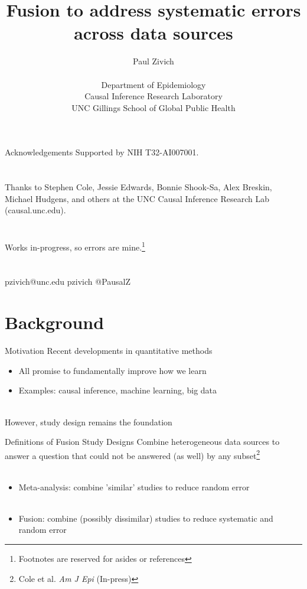 \documentclass{beamer}
\title[Data Fusion]{Fusion to address systematic errors across data sources}
\author[Paul Zivich]{Paul Zivich \\~\\ Department of Epidemiology \\ Causal Inference Research Laboratory \\ UNC Gillings School of Global Public Health}
\begin{document}
\begin{frame}[plain]
    \maketitle
\end{frame}

\begin{frame}{Acknowledgements}
	Supported by NIH T32-AI007001.\\~\\~\\
	
	Thanks to Stephen Cole, Jessie Edwards, Bonnie Shook-Sa, Alex Breskin, Michael Hudgens, and others at the UNC Causal Inference Research Lab (causal.unc.edu).\\~\\~\\
	
	Works in-progress, so errors are mine.\footnote[frame]{Footnotes are reserved for asides or references}\\~\\~\\
	
	\faEnvelope \quad pzivich@unc.edu \qquad \quad 
	\faGithub \quad pzivich \qquad \quad 
	\faTwitter \quad @PausalZ\\
\end{frame}

\section{Background}

\begin{frame}{Motivation}
	Recent developments in quantitative methods
	\begin{itemize}
		\item All promise to fundamentally improve how we learn
		\item Examples: causal inference, machine learning, big data
	\end{itemize}~\\
	However, study design remains the foundation
\end{frame}

\begin{frame}{Definitions of Fusion Study Designs}
	Combine heterogeneous data sources to answer a question that could not be answered (as well) by any subset\footnote[frame]{Cole et al. \textit{Am J Epi} (In-press)}~\\~\\
	\begin{itemize}
		\item Meta-analysis: combine 'similar' studies to reduce random error \\~\\
		\item Fusion: combine (possibly dissimilar) studies to reduce systematic and random error
	\end{itemize}
\end{frame}
\end{document}
